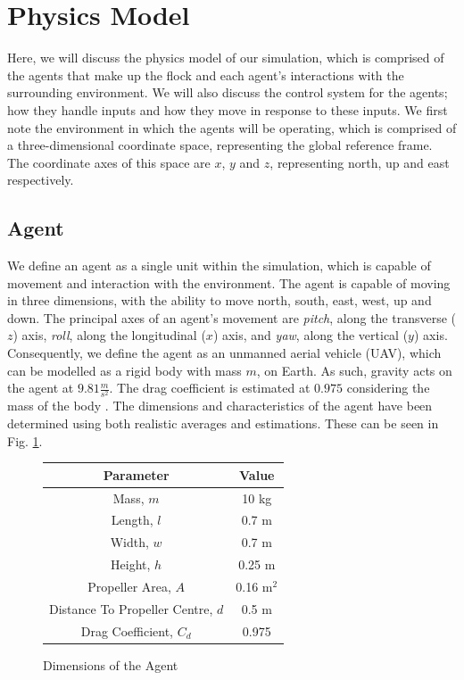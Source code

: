 \documentclass[12pt]{article}
\begin{document}
\newpage
\section{Physics Model}
Here, we will discuss the physics model of our simulation, which is comprised of the agents that make up the flock and each agent's interactions with the surrounding environment. We will also discuss the control system for the agents; how they handle inputs and how they move in response to these inputs. We first note the environment in which the agents will be operating, which is comprised of a three-dimensional coordinate space, representing the global reference frame. The coordinate axes of this space are $x$, $y$ and $z$, representing north, up and east respectively.

\subsection{Agent}
We define an agent as a single unit within the simulation, which is capable of movement and interaction with the environment. The agent is capable of moving in three dimensions, with the ability to move north, south, east, west, up and down. The principal axes of an agent's movement are \emph{pitch}, along the transverse ($z$) axis, \emph{roll}, along the longitudinal ($x$) axis, and \emph{yaw}, along the vertical ($y$) axis. Consequently, we define the agent as an unmanned aerial vehicle (UAV), which can be modelled as a rigid body with mass $m$, on Earth. As such, gravity acts on the agent at $9.81\frac{m}{s^2}$. The drag coefficient is estimated at $0.975$ considering the mass of the body \cite{Hattenberger}. The dimensions and characteristics of the agent have been determined using both realistic averages \cite{Figliozzi} and estimations. These can be seen in Fig. \ref{fig:dimensions}.

\begin{figure}[ht]
    \centering
    \begin{tabular}{| c | c |} 
    \hline
    Parameter & Value \\ 
    \hline
    Mass, $m$ & 10 kg \\
    \hline
    Length, $l$ & 0.7 m \\
    \hline
    Width, $w$ & 0.7 m \\
    \hline
    Height, $h$ & 0.25 m \\
    \hline
    Propeller Area, $A$ & 0.16 m$^2$ \\
    \hline
    Distance To Propeller Centre, $d$ & 0.5 m \\
    \hline
    Drag Coefficient, $C_d$ & 0.975 \\
    \hline
    \end{tabular}
    \caption{Dimensions of the Agent}
    \label{fig:dimensions}
\end{figure}
\end{document}
